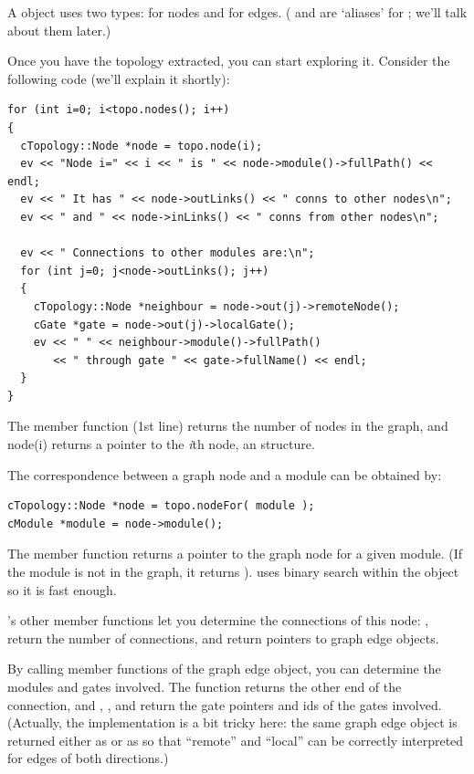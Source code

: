 A  object uses two types:  for
nodes and  for edges. ( and
 are `aliases' for ; we'll
talk about them later.)

Once you have the topology extracted, you can start exploring
it. Consider the following code (we'll explain it shortly):

\begin{verbatim}
for (int i=0; i<topo.nodes(); i++)
{
  cTopology::Node *node = topo.node(i);
  ev << "Node i=" << i << " is " << node->module()->fullPath() << endl;
  ev << " It has " << node->outLinks() << " conns to other nodes\n";
  ev << " and " << node->inLinks() << " conns from other nodes\n";

  ev << " Connections to other modules are:\n";
  for (int j=0; j<node->outLinks(); j++)
  {
    cTopology::Node *neighbour = node->out(j)->remoteNode();
    cGate *gate = node->out(j)->localGate();
    ev << " " << neighbour->module()->fullPath()
       << " through gate " << gate->fullName() << endl;
  }
}
\end{verbatim}

The  member function (1st line) returns the number of
nodes in the graph, and node(i) returns a pointer to the \textit{i}th
node, an  structure.


The correspondence between a graph node and a module can be obtained
by:

\begin{verbatim}
cTopology::Node *node = topo.nodeFor( module );
cModule *module = node->module();
\end{verbatim}


The  member function returns a pointer to the graph
node for a given module. (If the module is not in the graph, it
returns ).  uses binary search within the
 object so it is fast enough.


's other member functions let you determine the
connections of this node: ,  return
the number of connections,  and
 return pointers to graph edge objects.


By calling member functions of the graph edge object, you can
determine the modules and gates involved. The 
function returns the other end of the connection, and
, ,  and
 return the gate pointers and ids of the gates
involved. (Actually, the implementation is a bit tricky here: the same
graph edge object  is returned either as
 or as  so that ``remote''
and ``local'' can be correctly interpreted for edges of both
directions.)






